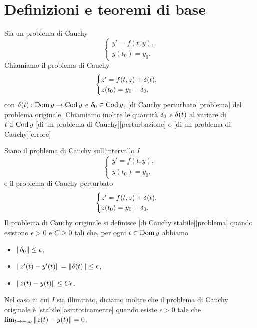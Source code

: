 \section{Definizioni e teoremi di base}
\label{MetodiNumericiPerEquazioniDifferenzialiOrdinarie_DefinizioniETeoremiDiBase}
\begin{Definition}
	Sia un problema di Cauchy
	\[
	\begin{cases}
		y' = f(t,y),\\
		y(t_0) = y_0.
	\end{cases}
	\]
	Chiamiamo il problema di Cauchy
	\[
	\begin{cases}
		z' = f(t,z) + \Perturbation(t),\\
		z(t_0) = y_0 + \Perturbation_0,
	\end{cases}
	\]
	con $\Perturbation(t): \Dom{y} \rightarrow \Cod{y}$ e
  $\Perturbation_0 \in \Cod{y}$,
  [di Cauchy perturbato][problema] del problema
  originale.
  Chiamiamo inoltre
  le quantit\`a $\Perturbation_0$ e
  $\Perturbation(t)$ al variare di $t \in \operatorname{Cod}{y}$
  [di un problema di Cauchy][perturbazione] o
  [di un problema di Cauchy][errore]
\end{Definition}
\begin{Definition}
	Siano il problema di Cauchy sull'intervallo $I$
	\[
	\begin{cases}
		y' = f(t,y),\\
		y(t_0) = y_0,
	\end{cases}
	\]
	e il problema di Cauchy perturbato
	\[
	\begin{cases}
		z' = f(t,z) + \Perturbation(t),\\
		z(t_0) = y_0 + \Perturbation_0.
	\end{cases}
	\]
	Il problema di Cauchy originale si definisce
  [di Cauchy stabile][problema]
  quando esistono $\epsilon > 0$ e $C \geq 0$ tali che,
  per ogni $t \in \operatorname{Dom}{y}$ abbiamo
	\begin{itemize}
    \item $\Norm{\Perturbation_0} \leq \epsilon$,
		\item $\Norm{z'(t) - y'(t)} = \Norm{\Perturbation(t)} \leq \epsilon$,
		\item $\Norm{z(t) - y(t)} \leq C \epsilon$.
	\end{itemize}
	\par Nel caso in cui $I$ sia illimitato, diciamo inoltre che il problema di Cauchy originale \`e [stabile][asintoticamente] quando esiste $\epsilon > 0$ tale che $\lim_{t \rightarrow + \infty} \Norm{z(t) - y(t)} = 0$.
\end{Definition}
